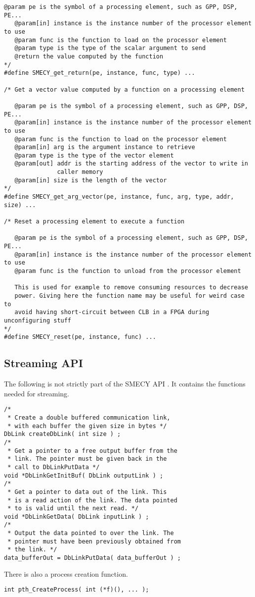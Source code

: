 \documentclass[a4paper]{article}
\begin{document}
\begin{lstlisting}[frame=none,numbers=none]
   @param pe is the symbol of a processing element, such as GPP, DSP, PE...
   @param[in] instance is the instance number of the processor element to use
   @param func is the function to load on the processor element
   @param type is the type of the scalar argument to send
   @return the value computed by the function
*/
#define SMECY_get_return(pe, instance, func, type) ...

/* Get a vector value computed by a function on a processing element

   @param pe is the symbol of a processing element, such as GPP, DSP, PE...
   @param[in] instance is the instance number of the processor element to use
   @param func is the function to load on the processor element
   @param[in] arg is the argument instance to retrieve
   @param type is the type of the vector element
   @param[out] addr is the starting address of the vector to write in
               caller memory
   @param[in] size is the length of the vector
*/
#define SMECY_get_arg_vector(pe, instance, func, arg, type, addr, size) ...

/* Reset a processing element to execute a function

   @param pe is the symbol of a processing element, such as GPP, DSP, PE...
   @param[in] instance is the instance number of the processor element to use
   @param func is the function to unload from the processor element

   This is used for example to remove consuming resources to decrease
   power. Giving here the function name may be useful for weird case to
   avoid having short-circuit between CLB in a FPGA during unconfiguring stuff
*/
#define SMECY_reset(pe, instance, func) ...
	\end{lstlisting}
	
	\subsection{Streaming API}
	The following is not strictly part of the SMECY API \cite{smec}. It contains the functions needed for streaming.
	\begin{lstlisting}[frame=none, numbers=none]
/*
 * Create a double buffered communication link,
 * with each buffer the given size in bytes */
DbLink createDbLink( int size ) ;
/*
 * Get a pointer to a free output buffer from the
 * link. The pointer must be given back in the
 * call to DbLinkPutData */
void *DbLinkGetInitBuf( DbLink outputLink ) ;
/*
 * Get a pointer to data out of the link. This
 * is a read action of the link. The data pointed
 * to is valid until the next read. */
void *DbLinkGetData( DbLink inputLink ) ;
/*
 * Output the data pointed to over the link. The
 * pointer must have been previously obtained from
 * the link. */
data_bufferOut = DbLinkPutData( data_bufferOut ) ;
	\end{lstlisting} 

	There is also a process creation function.
	\begin{lstlisting}[frame=none, numbers=none]
int pth_CreateProcess( int (*f)(), ... );
	\end{lstlisting}
	
	{}
	 

	
\end{document}
